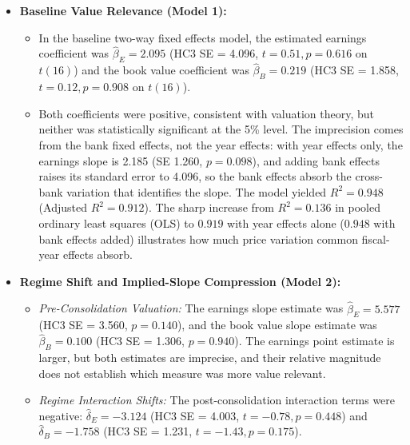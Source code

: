 \begin{itemize}
\begin{itemize}
        \item EPS and BVPS have a moderate bivariate correlation ($r = 0.372, p = 0.051$). Model~1 substantive-regressor VIFs are approximately 1.16. Model~2 VIFs are 10.33 (EPS), 2.28 (BVPS), 15.15 (EPS $\times$ Post), and 24.13 (BVPS $\times$ Post), warranting caution in interpreting individual coefficients. On the full fitted design the VIFs are 5.70 and 12.32 (Model~1) and 14.82, 12.46, 27.34 and 259.32 (Model~2).
    \end{itemize}
    \item \textbf{Baseline Value Relevance (Model 1):}
    \begin{itemize}
        \item In the baseline two-way fixed effects model, the estimated earnings coefficient was $\hat{\beta}_E = 2.095$ (HC3 SE = 4.096, $t = 0.51, p = 0.616$ on $t(16)$) and the book value coefficient was $\hat{\beta}_B = 0.219$ (HC3 SE = 1.858, $t = 0.12, p = 0.908$ on $t(16)$).
        \item Both coefficients were positive, consistent with valuation theory, but neither was statistically significant at the 5\% level. The imprecision comes from the bank fixed effects, not the year effects: with year effects only, the earnings slope is 2.185 (SE 1.260, $p = 0.098$), and adding bank effects raises its standard error to 4.096, so the bank effects absorb the cross-bank variation that identifies the slope. The model yielded $R^2 = 0.948$ (Adjusted $R^2 = 0.912$). The sharp increase from $R^2 = 0.136$ in pooled ordinary least squares (OLS) to $0.919$ with year effects alone ($0.948$ with bank effects added) illustrates how much price variation common fiscal-year effects absorb.
    \end{itemize}
    \item \textbf{Regime Shift and Implied-Slope Compression (Model 2):}
    \begin{itemize}
        \item \textit{Pre-Consolidation Valuation:} The earnings slope estimate was $\hat{\beta}_E = 5.577$ (HC3 SE = 3.560, $p = 0.140$), and the book value slope estimate was $\hat{\beta}_B = 0.100$ (HC3 SE = 1.306, $p = 0.940$). The earnings point estimate is larger, but both estimates are imprecise, and their relative magnitude does not establish which measure was more value relevant.
        \item \textit{Regime Interaction Shifts:} The post-consolidation interaction terms were negative: $\hat{\delta}_E = -3.124$ (HC3 SE = 4.003, $t = -0.78, p = 0.448$) and $\hat{\delta}_B = -1.758$ (HC3 SE = 1.231, $t = -1.43, p = 0.175$).

\end{itemize}
\end{itemize}

